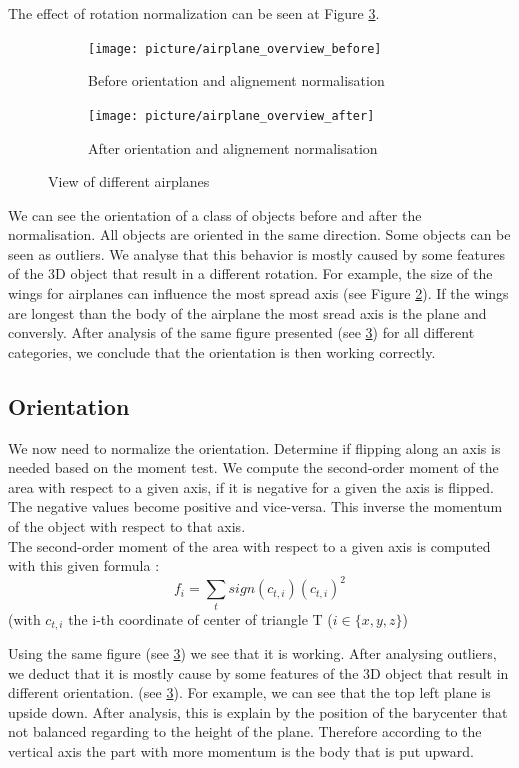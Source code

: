 \documentclass[10pt,twocolumn,letterpaper]{article}
\begin{document}
	The effect of rotation normalization can be seen at Figure \ref{fig:PCA-alignement}.

\begin{figure}
\centering
\begin{subfigure}{.5\textwidth}
  \centering
  \texttt{[image: picture/airplane\_overview\_before]}
  \caption{Before orientation and alignement normalisation}
  \label{fig:overview_before}
\end{subfigure}%
\begin{subfigure}{.5\textwidth}
  \centering
  \texttt{[image: picture/airplane\_overview\_after]}
  \caption{After orientation and alignement normalisation}
  \label{fig:overview_after}
\end{subfigure}
\caption{View of different airplanes}
\label{fig:PCA-alignement}
\end{figure}
	
	We can see the orientation of a class of objects before and after the normalisation. All objects are oriented in the same direction. Some objects can be seen as outliers. We analyse that this behavior is mostly caused by some features of the 3D object that result in a different rotation. For example, the size of the wings for airplanes can influence the most spread axis (see Figure \ref{fig:overview_after}). If the wings are longest than the body of the airplane the most sread axis is the plane and conversly. After analysis of the same figure presented (see \ref{fig:PCA-alignement}) for all different categories, we conclude that the orientation is then working correctly.
	
\subsection{Orientation}
	We now need to normalize the orientation. Determine if flipping along an axis is needed based on the moment test. We compute the second-order moment of the area with respect to a given axis, if it is negative for a given the axis is flipped. The negative values become positive and vice-versa. This inverse the momentum of the object with respect to that axis.\\
The second-order moment of the area with respect to a given axis is computed with this given formula :
	$$ f_i = \sum_{t} sign(c_{t,i})(c_{t,i})^2  $$ (with $c_{t,i}$ the i-th coordinate of center of triangle T ($i \in \{x,y,z\}$)
	
	Using the same figure (see \ref{fig:PCA-alignement}) we see that it is working. After analysing outliers, we deduct that it is mostly cause by some features of the 3D object that result in different orientation. (see \ref{fig:PCA-alignement}). For example, we can see that the top left plane is upside down. After analysis, this is explain by the position of the barycenter that not balanced regarding to the height of the plane. Therefore according to the vertical axis the part with more momentum is the body that is put upward.
	
\end{document}
